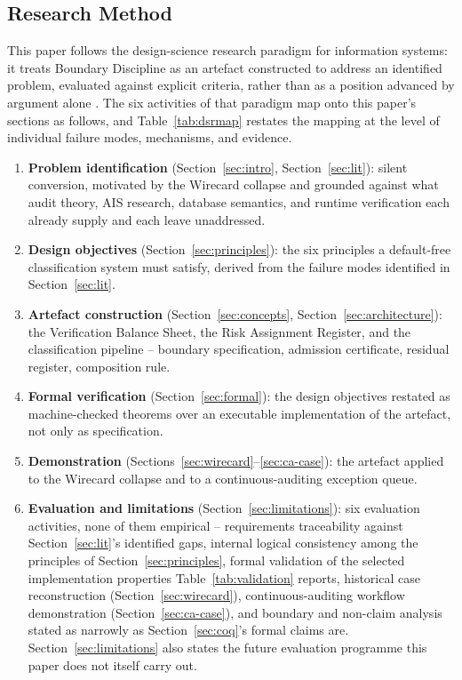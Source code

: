 \documentclass[11pt,a4paper]{article}
\theoremstyle{definition}
\theoremstyle{remark}
\begin{document}
\subsection{Research Method}
\label{sec:method}

This paper follows the design-science research paradigm for information systems: it treats Boundary Discipline as an artefact constructed to address an identified problem, evaluated against explicit criteria, rather than as a position advanced by argument alone \citep{hevner2004, peffers2007}. The six activities of that paradigm map onto this paper's sections as follows, and Table~\ref{tab:dsrmap} restates the mapping at the level of individual failure modes, mechanisms, and evidence.

\begin{enumerate}
\item \textbf{Problem identification} (Section~\ref{sec:intro}, Section~\ref{sec:lit}): silent conversion, motivated by the Wirecard collapse and grounded against what audit theory, AIS research, database semantics, and runtime verification each already supply and each leave unaddressed.
\item \textbf{Design objectives} (Section~\ref{sec:principles}): the six principles a default-free classification system must satisfy, derived from the failure modes identified in Section~\ref{sec:lit}.
\item \textbf{Artefact construction} (Section~\ref{sec:concepts}, Section~\ref{sec:architecture}): the Verification Balance Sheet, the Risk Assignment Register, and the classification pipeline -- boundary specification, admission certificate, residual register, composition rule.
\item \textbf{Formal verification} (Section~\ref{sec:formal}): the design objectives restated as machine-checked theorems over an executable implementation of the artefact, not only as specification.
\item \textbf{Demonstration} (Sections~\ref{sec:wirecard}--\ref{sec:ca-case}): the artefact applied to the Wirecard collapse and to a continuous-auditing exception queue.
\item \textbf{Evaluation and limitations} (Section~\ref{sec:limitations}): six evaluation activities, none of them empirical -- requirements traceability against Section~\ref{sec:lit}'s identified gaps, internal logical consistency among the principles of Section~\ref{sec:principles}, formal validation of the selected implementation properties Table~\ref{tab:validation} reports, historical case reconstruction (Section~\ref{sec:wirecard}), continuous-auditing workflow demonstration (Section~\ref{sec:ca-case}), and boundary and non-claim analysis stated as narrowly as Section~\ref{sec:coq}'s formal claims are. Section~\ref{sec:limitations} also states the future evaluation programme this paper does not itself carry out.
\end{enumerate}
\end{document}
